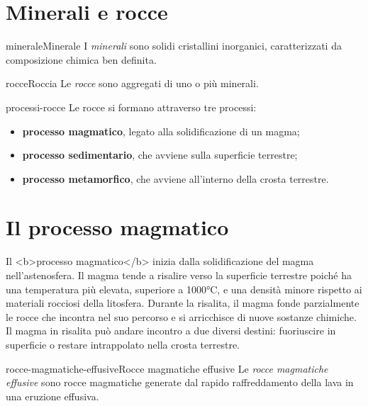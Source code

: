 \documentclass[preview]{standalone}
\begin{document}
\genpage

\section{Minerali e rocce}

\begin{snippetdefinition}{minerale}{Minerale}
    I \textit{minerali} sono solidi cristallini inorganici, caratterizzati da composizione chimica ben definita.
\end{snippetdefinition}

\begin{snippetdefinition}{rocce}{Roccia}
    Le \textit{rocce} sono aggregati di uno o più minerali.
\end{snippetdefinition}

\begin{snippet}{processi-rocce}
    Le rocce si formano attraverso tre processi:
    \begin{itemize}
        \item \textbf{processo magmatico}, legato alla solidificazione di un magma;
        \item \textbf{processo sedimentario}, che avviene sulla superficie terrestre;
        \item \textbf{processo metamorfico}, che avviene all'interno della crosta terrestre.
    \end{itemize}
\end{snippet}

\section{Il processo magmatico}

\begin{plainhtml}
    Il <b>processo magmatico</b> inizia dalla solidificazione del magma
    nell'astenosfera.
    Il magma tende a risalire verso la superficie terrestre poiché ha una temperatura più elevata,
    superiore a 1000°C, e una densità minore rispetto ai materiali rocciosi della litosfera.
    Durante la risalita, il magma fonde parzialmente le rocce che incontra nel suo percorso e si
    arricchisce di nuove sostanze chimiche.
    Il magma in risalita può andare incontro a due diversi destini: fuoriuscire in superficie
    o restare intrappolato nella crosta terrestre.
\end{plainhtml}

\begin{snippetdefinition}{rocce-magmatiche-effusive}{Rocce magmatiche effusive}
    Le \textit{rocce magmatiche effusive} sono rocce magmatiche generate dal rapido raffreddamento
    della lava in una eruzione effusiva.
\end{snippetdefinition}
\end{document}
